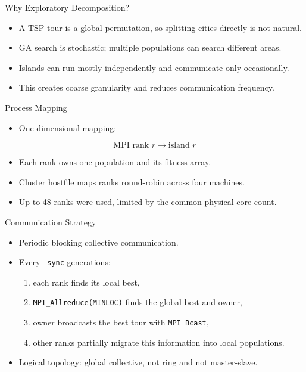 \documentclass[aspectratio=169]{beamer}
\begin{document}
\begin{frame}{Why Exploratory Decomposition?}
  \begin{itemize}
    \item A TSP tour is a global permutation, so splitting cities directly is not natural.
    \item GA search is stochastic; multiple populations can search different areas.
    \item Islands can run mostly independently and communicate only occasionally.
    \item This creates coarse granularity and reduces communication frequency.
  \end{itemize}
\end{frame}

\begin{frame}{Process Mapping}
  \begin{itemize}
    \item One-dimensional mapping:
  \end{itemize}
  \[
    \text{MPI rank } r \rightarrow \text{island } r
  \]
  \begin{itemize}
    \item Each rank owns one population and its fitness array.
    \item Cluster hostfile maps ranks round-robin across four machines.
    \item Up to 48 ranks were used, limited by the common physical-core count.
  \end{itemize}
\end{frame}

\begin{frame}{Communication Strategy}
  \begin{itemize}
    \item Periodic blocking collective communication.
    \item Every \texttt{--sync} generations:
      \begin{enumerate}
        \item each rank finds its local best,
        \item \texttt{MPI\_Allreduce(MINLOC)} finds the global best and owner,
        \item owner broadcasts the best tour with \texttt{MPI\_Bcast},
        \item other ranks partially migrate this information into local populations.
      \end{enumerate}
    \item Logical topology: global collective, not ring and not master-slave.
  \end{itemize}
\end{frame}
\end{document}
